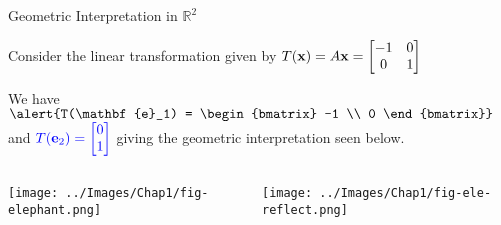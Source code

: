 \documentclass[xcoler=dvipsnames, aspectratio=169]{beamer}
\begin{document}
\begin{frame}{Geometric Interpretation in $\mathbb{R}^2$}

Consider the linear transformation given by $\displaystyle T(\mathbf{x}) = A \mathbf{x} = \begin{bmatrix} -1 & 0 \\ 0 & 1 \end{bmatrix}$ 

We have  $\dsty \alert{T(\mathbf{e}_1) = \begin{bmatrix} -1 \\ 0 \end{bmatrix}}$ and $\displaystyle \textcolor{blue}{T(\mathbf{e}_2) = \begin{bmatrix} 0 \\ 1 \end{bmatrix}}$ giving the geometric interpretation seen below.

\begin{columns}

\column{0.5\tw}

\begin{center}
\texttt{[image: ../Images/Chap1/fig-elephant.png]}
\end{center}

\column{0.5\tw}

\begin{center}
\texttt{[image: ../Images/Chap1/fig-ele-reflect.png]}
\end{center}

\end{columns}

\end{frame}
\end{document}
